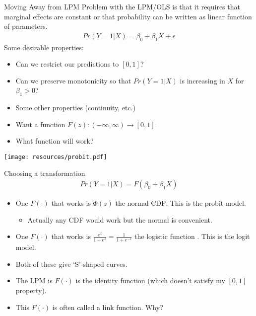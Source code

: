 \documentclass[aspectratio=169]{beamer}
\begin{document}
\begin{frame}{Moving Away from LPM}
Problem with the LPM/OLS is that it requires that \alert{marginal effects are constant} or that probability can be written as linear function of parameters.
\begin{eqnarray*}
Pr(Y=1 | X) = \beta_0 + \beta_1 X+ \epsilon
\end{eqnarray*}
Some desirable properties:
\begin{itemize}
\item Can we restrict our predictions to $[0,1]$?
\item Can we preserve \alert{monotonicity} so that $Pr(Y=1| X)$ is increasing in $X$ for $\beta_1 >0$?
\item Some other properties (continuity, etc.) \pause
\item Want a function $F(z): (-\infty,\infty) \rightarrow [0,1]$.
\item What function will work?
\end{itemize}
\end{frame}

\begin{frame}
\begin{center}
\texttt{[image: resources/probit.pdf]}
\end{center}
\end{frame}

\begin{frame}{Choosing a transformation}
\begin{eqnarray*}
Pr(Y=1 | X) = F(\beta_0 + \beta_1 X)
\end{eqnarray*}
\begin{itemize}
\item One $F(\cdot)$ that works is $\Phi(z)$ the normal CDF. This is the \alert{probit} model.
\begin{itemize}
\item Actually any CDF would work but the normal is convenient.
\end{itemize}
\item One $F(\cdot)$ that works is $\frac{e^z}{1+ e^z}=\frac{1}{1+e^{-z}}$ the logistic function . This is the \alert{logit} model.
\item Both of these give `S'-shaped curves.
\item The LPM is $F(\cdot)$ is the \alert{identity function} (which doesn't satisfy my $[0,1]$ property).
\item This $F(\cdot)$ is often called a \alert{link function}. Why?
\end{itemize}
\end{frame}
\end{document}
